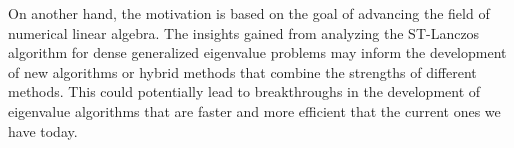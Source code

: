 On another hand, the motivation is based on the goal of advancing the field of numerical linear algebra. The insights gained from analyzing the ST-Lanczos algorithm for dense generalized eigenvalue problems may inform the development of new algorithms or hybrid methods that combine the strengths of different methods. This could potentially lead to breakthroughs in the development of eigenvalue algorithms that are faster and more efficient that the current ones we have today.